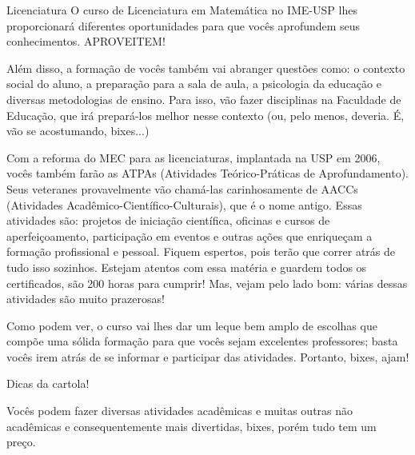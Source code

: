 \begin{subsecao}{Licenciatura}
O curso de Licenciatura em Matemática no IME-USP lhes proporcionará diferentes oportunidades para
que vocês aprofundem seus conhecimentos. APROVEITEM!

Além disso, a formação de vocês também vai abranger questões como: o contexto
social do aluno, a preparação para a sala de aula, a psicologia da educação e
diversas metodologias de ensino. Para isso, vão fazer disciplinas na
Faculdade de Educação, que irá prepará-los melhor nesse contexto (ou, pelo
menos, deveria. É, vão se acostumando, bixes...)

Com a reforma do MEC para as licenciaturas, implantada na USP em 2006,
vocês também farão as ATPAs (Atividades Teórico-Práticas de Aprofundamento).
Seus veteranes provavelmente vão chamá-las carinhosamente de AACCs (Atividades
Acadêmico-Científico-Culturais), que é o nome antigo. Essas atividades são:
projetos de iniciação científica, oficinas e cursos de aperfeiçoamento,
participação em eventos e outras ações que enriqueçam a formação profissional e
pessoal. Fiquem espertos, pois terão que correr atrás de tudo isso sozinhos.
Estejam atentos com essa matéria e guardem todos os certificados, são 200 horas para cumprir! 
Mas, vejam pelo lado bom: várias dessas atividades são muito prazerosas!

Como podem ver, o curso vai lhes dar um leque bem amplo de escolhas que
compõe uma sólida formação para que vocês sejam excelentes professores; basta 
vocês irem atrás de se informar e participar das atividades. Portanto, bixes, ajam!

\begin{subsubsecao}{Dicas da cartola!}

Vocês podem fazer diversas atividades acadêmicas e muitas outras não acadêmicas e
consequentemente mais divertidas, bixes, porém tudo tem um preço.


\end{subsubsecao}
\end{subsecao}

